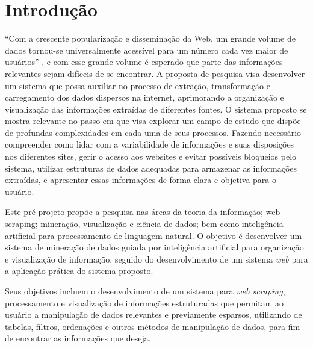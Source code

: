 \section{Introdução}




``Com a crescente popularização e disseminação da Web, um grande volume de dados tornou-se universalmente acessível para um número cada vez maior de usuários'' \cite{2001Alisson}, e com esse grande volume é esperado que parte das informações relevantes sejam difíceis de se encontrar. A proposta de pesquisa visa desenvolver um sistema que possa auxiliar no processo de extração, transformação e carregamento dos dados dispersos na internet, aprimorando a organização e visualização das informações extraídas de diferentes fontes. O sistema proposto se mostra relevante no passo em que visa explorar um campo de estudo que dispõe de profundas complexidades em cada uma de seus processos. Fazendo necessário compreender como lidar com a variabilidade de informações e suas disposições nos diferentes sites, gerir o acesso aos websites e evitar possíveis bloqueios pelo sistema, utilizar estruturas de dados adequadas para armazenar as informações extraídas, e apresentar essas informações de forma clara e objetiva para o usuário.

Este pré-projeto propõe a pesquisa nas áreas da teoria da informação; web scraping; mineração, visualização e ciência de dados; bem como inteligência artificial para processamento de linguagem natural. O objetivo é desenvolver um sistema de mineração de dados guiada por inteligência artificial para organização e visualização de informação, seguido do desenvolvimento de um sistema \textit{web} para a aplicação prática do sistema proposto.

Seus objetivos incluem o desenvolvimento de um sistema para \textit{web scraping}, processamento e visualização de informações estruturadas que permitam ao usuário a manipulação de dados relevantes e previamente esparsos, utilizando de tabelas, filtros, ordenações e outros métodos de manipulação de dados, para fim de encontrar as informações que deseja.

